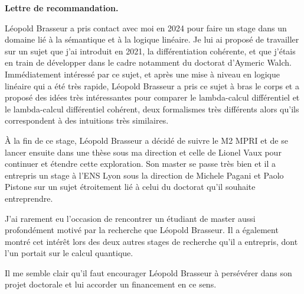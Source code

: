 \documentclass[12pt,pdftex]{letter}
\begin{document}
 \address{\vspace*{2cm}\\
 }

\signature{
\vspace{-2cm}
\texttt{[image: s4.jpg]}\\
Thomas Ehrhard\\ 
Directeur de recherche au CNRS\\
IRIF, UMR 8243
}

\begin{letter}{}

\newcommand\Name{Léopold Brasseur}
\newcommand\Fname{Brasseur}
\newcommand\Pname{Léopold}


\opening{\textbf{Lettre de recommandation.}}

\Name{} a pris contact avec moi en 2024 pour faire un stage dans un
domaine lié à la sémantique et à la logique linéaire.
%
Je lui ai proposé de travailler sur un sujet que j'ai introduit en
2021, la différentiation cohérente, et que j'étais en train de développer
dans le cadre notamment du doctorat d'Aymeric Walch.
%
Immédiatement intéressé par ce sujet, et après une mise à niveau en
logique linéaire qui a été très rapide, \Name{} a pris ce sujet à bras
le corps et a proposé des idées très intéressantes pour comparer le
lambda-calcul différentiel et le lambda-calcul différentiel cohérent,
deux formalismes très différents alors qu'ils correspondent à des
intuitions très similaires.

À la fin de ce stage, \Name{} a décidé de suivre le M2 MPRI et de se
lancer ensuite dans une thèse sous ma direction et celle de Lionel
Vaux pour continuer et étendre cette exploration.
%
Son master se passe très bien et il a entrepris un stage à l'ENS Lyon
sous la direction de Michele Pagani et Paolo Pistone sur un sujet
étroitement lié à celui du doctorat qu'il souhaite entreprendre.

J'ai rarement eu l'occasion de rencontrer un étudiant de master aussi
profondément motivé par la recherche que \Name{}.
%
Il a également montré cet intérêt lors des deux autres stages de
recherche qu'il a entrepris, dont l'un portait sur le calcul
quantique.
%


Il me semble clair qu'il faut encourager \Name{} à
persévérer dans son projet doctorale et lui accorder un financement en
ce sens.



  \closing{\ }

\end{letter}
\end{document}
